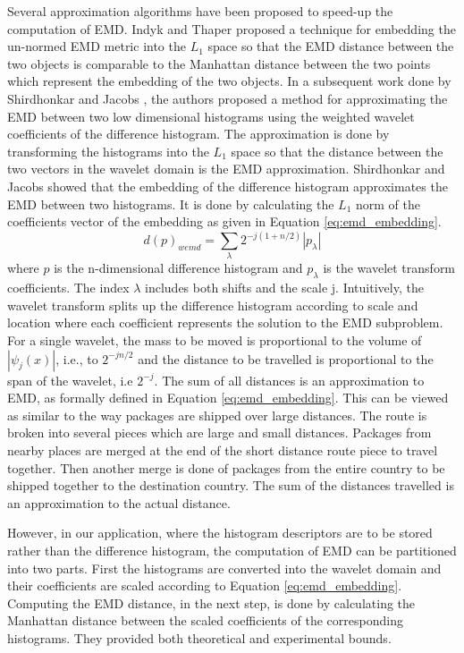 \documentclass[10pt, conference, compsocconf]{IEEEtran}
\theoremstyle{definition}
\begin{document}
Several approximation algorithms have been proposed to speed-up the computation of EMD. 
Indyk and Thaper \cite{indyk2003fast} proposed a technique for embedding the un-normed EMD metric into the $L_1$ space so that the EMD distance between the two objects is comparable to the Manhattan distance between the two points which represent the embedding of the two objects.
In a subsequent work done by Shirdhonkar and Jacobs \cite{shirdhonkar2008approximate}, the authors proposed a method for approximating the EMD between two low dimensional histograms using the weighted wavelet coefficients of the difference histogram. 
The approximation is done by transforming the histograms into the $L_1$ space so that the distance between the two vectors in the wavelet domain is the EMD approximation. 
Shirdhonkar and Jacobs showed that the embedding of the difference histogram approximates the EMD between two histograms. It is done by calculating the $L_1$ norm of the coefficients vector of the embedding as given in Equation \ref{eq:emd_embedding}.
\begin{equation}
d(p)_{wemd}= \sum\limits_{\lambda} 2^{-j(1+n/2)}|p_{\lambda}|
\label{eq:emd_embedding}
\end{equation}
where $p$ is the n-dimensional difference histogram and $p_{\lambda}$ is the wavelet transform coefficients. 
The index $\lambda$ includes both shifts and the scale j.
Intuitively, the wavelet transform splits up the difference histogram according to scale and location where each coefficient represents the solution to the EMD subproblem. 
For a single wavelet, the mass to be moved is proportional to the volume of $|\psi_j(x)|$, i.e., to $2^{-jn/2}$ and the distance to be travelled is proportional to the span of the wavelet, i.e $2^{-j}$. The sum of all distances is an approximation to EMD, as formally defined in Equation \ref{eq:emd_embedding}. 
This can be viewed as similar to the way packages are shipped over large distances. 
The route is broken into several pieces which are large and small distances. 
Packages from nearby places are merged at the end of the short distance route piece to travel together. 
Then another merge is done of packages from the entire country to be shipped together to the destination country. 
The sum of the distances travelled is an approximation to the actual distance.

However, in our application, where the histogram descriptors are to be stored rather than the difference histogram, the computation of EMD can be partitioned into two parts. 
First the histograms are converted into the wavelet domain and their coefficients are scaled according to Equation \ref{eq:emd_embedding}. 
Computing the EMD distance, in the next step, is done by calculating the Manhattan distance between the scaled coefficients of the corresponding histograms.
They provided both theoretical and experimental bounds. 
\end{document}
